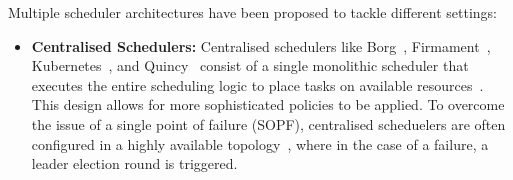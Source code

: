 Multiple scheduler architectures have been proposed to tackle different
settings:
\begin{itemize}
    \item \textbf{Centralised Schedulers:} Centralised schedulers like
        Borg~\cite{verma2015large}, Firmament~\cite{gog_firmament_2016}, Kubernetes~\cite{ungureanu2019kubernetes}, and Quincy~\cite{isard2009quincy}
        consist of a single monolithic scheduler that executes the entire
        scheduling logic to place tasks on available resources~\cite{schwarzkopf2016evolution}. This
        design allows for more sophisticated policies to be applied. To overcome the
        issue of a single point of failure (SOPF), centralised scheduelers are
        often configured in a highly available topology~\cite{boutin2014apollo, ungureanu2019kubernetes, verma2015large},
        where in the case of a failure, a leader election round is triggered.


\end{itemize}
